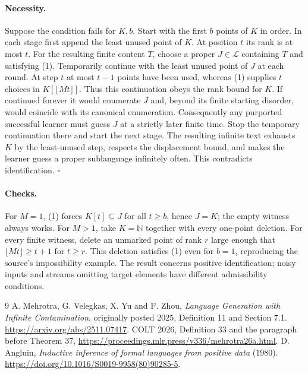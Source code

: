 \documentclass[11pt]{article}
\begin{document}
\paragraph{Necessity.} Suppose the condition fails for $K,b$. Start with the first $b$ points of $K$ in order. In each stage first append the least unused point of $K$. At position $t$ its rank is at most $t$. For the resulting finite content $T$, choose a proper $J\in\mathcal L$ containing $T$ and satisfying (1). Temporarily continue with the least unused point of $J$ at each round. At step $t$ at most $t-1$ points have been used, whereas (1) supplies $t$ choices in $K[\lfloor Mt\rfloor]$. Thus this continuation obeys the rank bound for $K$. If continued forever it would enumerate $J$ and, beyond its finite starting disorder, would coincide with its canonical enumeration. Consequently any purported successful learner must guess $J$ at a strictly later finite time. Stop the temporary continuation there and start the next stage. The resulting infinite text exhausts $K$ by the least-unused step, respects the displacement bound, and makes the learner guess a proper sublanguage infinitely often. This contradicts identification. \hfill$\square$

\paragraph{Checks.} For $M=1$, (1) forces $K[t]\subseteq J$ for all $t\ge b$, hence $J=K$; the empty witness always works. For $M>1$, take $K=\mathbb N$ together with every one-point deletion. For every finite witness, delete an unmarked point of rank $r$ large enough that $\lfloor Mt\rfloor\ge t+1$ for $t\ge r$. This deletion satisfies (1) even for $b=1$, reproducing the source's impossibility example. The result concerns positive identification; noisy inputs and streams omitting target elements have different admissibility conditions.
\begin{thebibliography}{9}
 A. Mehrotra, G. Velegkas, X. Yu and F. Zhou, \emph{Language Generation with Infinite Contamination}, originally posted 2025, Definition 11 and Section 7.1. \url{https://arxiv.org/abs/2511.07417}. COLT 2026, Definition 33 and the paragraph before Theorem 37, \url{https://proceedings.mlr.press/v336/mehrotra26a.html}.
 D. Angluin, \emph{Inductive inference of formal languages from positive data} (1980). \url{https://doi.org/10.1016/S0019-9958(80)90285-5}.
\end{thebibliography}
\end{document}
